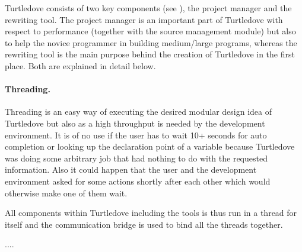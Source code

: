 Turtledove consists of two key components (see ),
the project manager and the rewriting tool. The project manager is an important
part of Turtledove with respect to performance (together with the source
management module) but also to help the novice
programmer in building medium/large programs, whereas the rewriting tool is the
main purpose behind the creation of Turtledove in the first place. Both are
explained in detail below.

\paragraph{Threading.}

Threading is an easy way of executing the desired modular design idea of
Turtledove but also as a high throughput is needed by the development
environment. It is of no use if the user has to wait 10+ seconds for auto
completion or looking up the declaration point of a variable because Turtledove
was doing some arbitrary job that had nothing to do with the requested
information. Also it could happen that the user and the development environment
asked for some actions shortly after each other which would otherwise make one
of them wait.

All components within Turtledove including the tools is thus run in a thread for
itself and the communication bridge is used to bind all the threads together.













....

